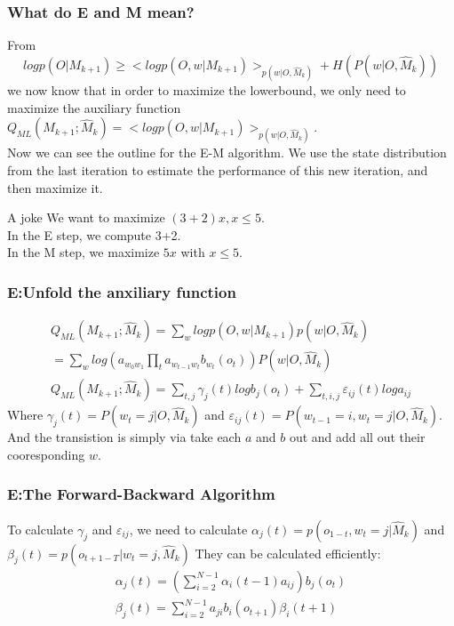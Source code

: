 \documentclass{beamer}
\begin{document}
\begin{frame}
\frametitle{What do E and M mean?}
From 
\begin{equation}
logp(O|M_{k+1}) \geq <logp(O,w|M_{k+1})>_{p(w|O,\hat{M}_k)} + H(P(w|O,\hat{M}_k))
\end{equation}
we now know that in order to maximize the lowerbound, we only need to maximize the auxiliary function $Q_{ML}(M_{k+1};\hat{M}_k) = <logp(O,w|M_{k+1})>_ {p(w|O,\hat{M}_k)}$.\\
Now we can see the outline for the E-M algorithm. We use the state distribution from the last iteration to \alert{estimate} the performance of this new iteration, and then \alert{maximize} it.
\begin{block}{A joke}
We want to maximize $(3+2)x, x \leq 5$.\\
In the E step, we compute 3+2.\\
In the M step, we maximize $5x$ with $x \leq 5$.
\end{block}
\end{frame}

\begin{frame}
\frametitle{E:Unfold the anxiliary function}
\begin{equation}
\begin{split}
Q_{ML}(M_{k+1};\hat{M}_{k}) = \sum_w logp(O,w|M_{k+1})p(w|O,\hat{M}_k) \\
                            = \sum_w log(a_{w_0w_1}\prod_ta_{w_{t-1}w_t}b_{w_t}(o_t)) P(w|O, \hat{M}_k) \\
Q_{ML}(M_{k+1};\hat{M}_{k}) = \sum_{t,j} \gamma_j(t)logb_j(o_t)+\sum_{t,i,j}\varepsilon_{ij}(t)loga_{ij}
\end{split}                 
\end{equation}
Where $\gamma_j(t) = P(w_t=j|O,\hat{M}_k)$ and $\varepsilon_{ij}(t) = P(w_{t-1}=i,w_t=j|O,\hat{M}_k)$. And the transistion is simply via take each $a$ and $b$ out and add all out their cooresponding $w$.
\end{frame}

\begin{frame}
\frametitle{E:The Forward-Backward Algorithm}
To calculate $\gamma_j$ and $\varepsilon_{ij}$, we need to calculate $\alpha_j(t) = p(o_{1-t}, w_t=j|\hat{M}_k)$ and $\beta_j(t)=p(o_{t+1-T}|w_t=j, \hat{M}_k)$
They can be calculated efficiently:
\begin{equation}
\begin{split}
\alpha_j(t) = (\sum_{i=2}^{N-1}\alpha_i(t-1)a_{ij})b_j(o_t) \\
\beta_j(t) = \sum_{i=2}^{N-1}a_{ji}b_i(o_{t+1})\beta_i(t+1)
\end{split}
\end{equation}
\end{frame}
\end{document}
